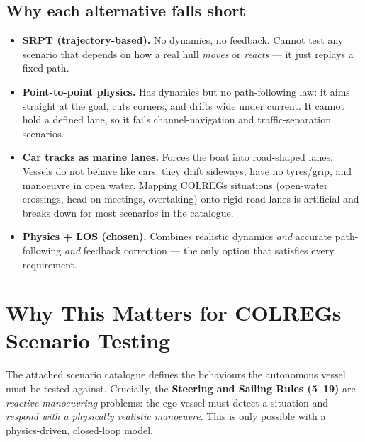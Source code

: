 \documentclass[11pt]{article}
\begin{document}
\subsection*{Why each alternative falls short}
\begin{itemize}[leftmargin=1.6em]
    \item \textbf{SRPT (trajectory-based).} No dynamics, no feedback. Cannot test any scenario that
    depends on how a real hull \emph{moves} or \emph{reacts} --- it just replays a fixed path.
    \item \textbf{Point-to-point physics.} Has dynamics but no path-following law: it aims straight at
    the goal, cuts corners, and drifts wide under current. It cannot hold a defined lane, so it fails
    channel-navigation and traffic-separation scenarios.
    \item \textbf{Car tracks as marine lanes.} Forces the boat into road-shaped lanes. Vessels do not
    behave like cars: they drift sideways, have no tyres/grip, and manoeuvre in open water. Mapping
    COLREGs situations (open-water crossings, head-on meetings, overtaking) onto rigid road lanes is
    artificial and breaks down for most scenarios in the catalogue.
    \item \textbf{Physics + LOS (chosen).} Combines realistic dynamics \emph{and} accurate path-following
    \emph{and} feedback correction --- the only option that satisfies every requirement.
\end{itemize}

\section{Why This Matters for COLREGs Scenario Testing}
The attached scenario catalogue defines the behaviours the autonomous vessel must be tested against.
Crucially, the \textbf{Steering and Sailing Rules (5--19)} are \emph{reactive manoeuvring} problems:
the ego vessel must detect a situation and \emph{respond with a physically realistic manoeuvre}. This
is only possible with a physics-driven, closed-loop model.
\end{document}
